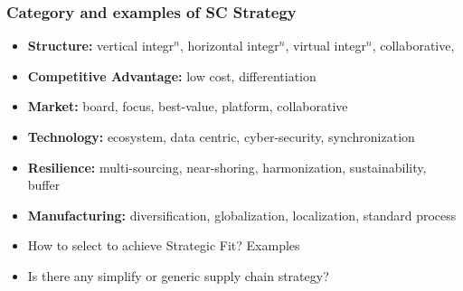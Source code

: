 \documentclass[10pt,handout,notes=show]{beamer}
\begin{document}
\begin{frame}
  \frametitle{Category and examples of SC Strategy}

  \begin{itemize}
    \item \textbf{Structure:} vertical integr$^n$, horizontal integr$^n$, virtual integr$^n$, collaborative,
    \item \textbf{Competitive Advantage:} low cost, differentiation
    \item \textbf{Market:} board, focus, best-value, platform, collaborative
    \item \textbf{Technology:} ecosystem, data centric, cyber-security, synchronization
    \item \textbf{Resilience:} multi-sourcing, near-shoring, harmonization, sustainability, buffer
    \item \textbf{Manufacturing:} diversification, globalization, localization, standard process
  \end{itemize}

  \NextLine
  \begin{alertblock}{}{}
    \begin{itemize}
      \item How to select to achieve \alert{Strategic Fit}? Examples \hfill \hyperlink{SC-Fit}{}
      \item Is there any simplify or generic supply chain strategy? \hfill \hyperlink{SC-Strategy}{}
    \end{itemize}
  \end{alertblock}


\end{frame}
\end{document}
